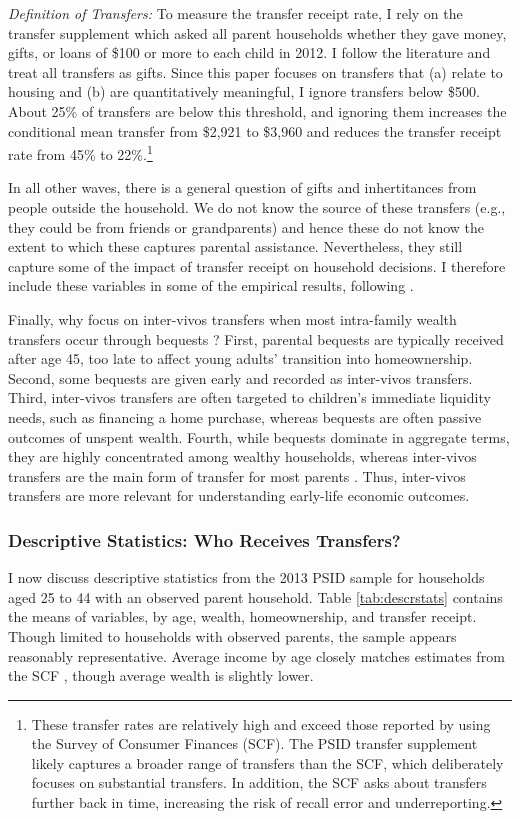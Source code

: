 \documentclass[12pt]{article}
\begin{document}
\textit{Definition of Transfers:} To measure the transfer receipt rate, I rely on the transfer supplement which asked all parent households whether they gave money, gifts, or loans of \$100 or more to each child in 2012. I follow the literature \citep[e.g.,][]{mcgarry2016dynamic} and treat all transfers as gifts. Since this paper focuses on transfers that (a) relate to housing and (b) are quantitatively meaningful, I ignore transfers below \$500. About 25\% of transfers are below this threshold, and ignoring them increases the conditional mean transfer from \$2,921 to \$3,960 and reduces the transfer receipt rate from 45\% to 22\%.\footnote{These transfer rates are relatively high and exceed those reported by \citealt{feiveson2019lifecycle} using the Survey of Consumer Finances (SCF). The PSID transfer supplement likely captures a broader range of transfers than the SCF, which deliberately focuses on substantial transfers. In addition, the SCF asks about transfers further back in time, increasing the risk of recall error and underreporting.}

In all other waves, there is a general question of gifts and inhertitances from people outside the household. We do not know the source of these transfers (e.g., they could be from friends or grandparents) and hence these do not know the extent to which these captures parental assistance. Nevertheless, they still capture some of the impact of transfer receipt on household decisions. I therefore include these variables in some of the empirical results, following \citet{Lee2018}.

Finally, why focus on inter-vivos transfers when most intra-family wealth transfers occur through bequests \citep[see e.g.,][]{feiveson2019lifecycle}? First, parental bequests are typically received after age 45, too late to affect young adults' transition into homeownership. Second, some bequests are given early and recorded as inter-vivos transfers. Third, inter-vivos transfers are often targeted to children's immediate liquidity needs, such as financing a home purchase, whereas bequests are often passive outcomes of unspent wealth. Fourth, while bequests dominate in aggregate terms, they are highly concentrated among wealthy households, whereas inter-vivos transfers are the main form of transfer for most parents \citep{yang2023financial}. Thus, inter-vivos transfers are more relevant for understanding early-life economic outcomes. 


\subsubsection{Descriptive Statistics: Who Receives Transfers?}
I now discuss descriptive statistics from the 2013 PSID sample for households aged 25 to 44 with an observed parent household. Table \ref{tab:descrstats} contains the means of variables, by age, wealth, homeownership, and transfer receipt. Though limited to households with observed parents, the sample appears reasonably representative. Average income by age closely matches estimates from the SCF \cite[see e.g.,][]{kuhn20162013}, though average wealth is slightly lower.
\end{document}
